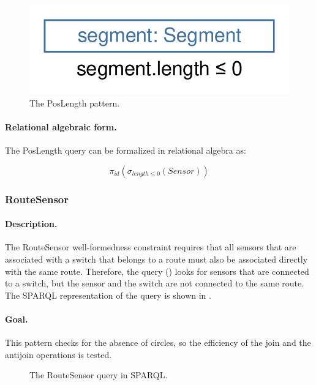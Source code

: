 \begin{figure}[Htb]
		\centering
		\includegraphics[scale=0.4]{figures/trainbenchmark-poslength}
		\caption{The \textsf{PosLength} pattern.}
		\label{fig:trainbenchmark-poslength}
\end{figure}

\paragraph{Relational algebraic form.} The \textsf{PosLength} query can be formalized in relational algebra as:

$$ \pi_{\mathit{id}} \left( \sigma_{\mathit{length} \leq 0} \left( \mathit{Sensor} \right) \right) $$

\subsubsection{RouteSensor}

\paragraph{Description.} The \textsf{RouteSensor} well-formedness constraint requires that all sensors that are associated with a switch that belongs to a route must also be associated directly with the same route. Therefore, the query () looks for sensors that are connected to a switch, but the sensor and the switch are not connected to the same route. The SPARQL representation of the query is shown in .

\paragraph{Goal.} This pattern checks for the absence of circles, so the efficiency of the join and the antijoin operations is tested.

\begin{figure}[Htb]
\centering
\begin{minipage}{0.6\textwidth}
  { \alignListing
    }
  \caption{The \textsf{RouteSensor} query in SPARQL.}
  \label{lst:routesensor-sparql-nac}
\end{minipage}
\end{figure}

